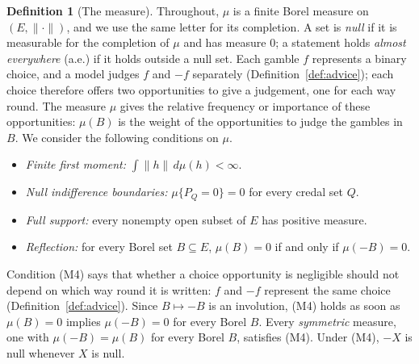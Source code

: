 \documentclass[11pt]{article}
\theoremstyle{plain}
\theoremstyle{definition}
\newtheorem{definition}[theorem]{Definition}
\begin{document}
\begin{definition}[The measure]\label{def:measure}
Throughout, $\mu$ is a finite Borel measure on $(E,\|\cdot\|)$, and we use the same letter for
its completion. A set is \emph{null} if it is measurable for the completion of $\mu$ and has
measure $0$; a statement holds \emph{almost everywhere} (a.e.) if it holds outside a null set.
Each gamble $f$ represents a binary choice, and a model judges $f$ and $-f$ separately
(Definition~\ref{def:advice}); each choice therefore offers two opportunities to give a
judgement, one for each way round. The measure $\mu$ gives the relative frequency or importance
of these opportunities: $\mu(B)$ is the weight of the opportunities to judge the gambles in $B$.
We consider the following conditions on $\mu$.
\begin{itemize}
  \item[(M1)] \emph{Finite first moment:} $\int\|h\|\,d\mu(h)<\infty$.
  \item[(M2)] \emph{Null indifference boundaries:} $\mu\{P_Q=0\}=0$ for every credal set $Q$.
  \item[(M3)] \emph{Full support:} every nonempty open subset of $E$ has positive measure.
  \item[(M4)] \emph{Reflection:} for every Borel set $B\subseteq E$, $\mu(B)=0$ if and only if
  $\mu(-B)=0$.
\end{itemize}
Condition (M4) says that whether a choice opportunity is negligible should not depend on which
way round it is written: $f$ and $-f$ represent the same choice (Definition~\ref{def:advice}).
Since $B\mapsto-B$ is an involution, (M4) holds as soon as $\mu(B)=0$ implies $\mu(-B)=0$ for
every Borel $B$. Every \emph{symmetric} measure, one with $\mu(-B)=\mu(B)$ for every Borel $B$,
satisfies (M4). Under (M4), $-X$ is null whenever $X$ is null.
\end{definition}
\end{document}
